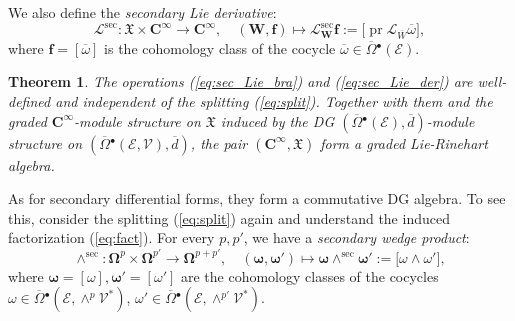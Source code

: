 \documentclass{conm-p-l}
\newtheorem{theorem}{Theorem}[section]
\theoremstyle{definition}
\theoremstyle{remark}
\numberwithin{equation}{section}
\begin{document}
We also define the \emph{secondary Lie derivative}:
\begin{equation}\label{eq:sec_Lie_der}
\mathcal L^{\mathrm{sec}} : \boldsymbol{\mathfrak X} \times \boldsymbol{C}^\infty \to  \boldsymbol{C}^\infty, \quad \left(\boldsymbol W, \boldsymbol f \right) \mapsto \mathcal L^{\mathrm{sec}}_{\boldsymbol W} \boldsymbol f :=\big[ \operatorname{pr} \mathcal L_{\overline W} \overline \omega \big],
\end{equation}
where $\boldsymbol f = [\overline \omega]$ is the cohomology class of the cocycle $\overline \omega \in \overline \Omega{}^\bullet (\mathscr E)$. 

\begin{theorem}\label{theor:LR}
The operations (\ref{eq:sec_Lie_bra}) and (\ref{eq:sec_Lie_der}) are well-defined and independent of the splitting (\ref{eq:split}). Together with them and the graded $\boldsymbol C^\infty$-module structure on $\boldsymbol{\mathfrak X}$ induced by the DG $(\overline \Omega{}^\bullet (\mathscr E), \overline d)$-module structure on $(\overline \Omega{}^\bullet (\mathscr E, \mathscr V), \overline d)$, the pair $(\boldsymbol{C}^\infty, \boldsymbol{\mathfrak X})$ form a graded Lie-Rinehart algebra.
\end{theorem}

As for secondary differential forms, they form a commutative DG algebra. To see this, consider the splitting (\ref{eq:split}) again and understand the induced factorization (\ref{eq:fact}). For every $p, p'$, we have a \emph{secondary wedge product}:
\begin{equation}\label{eq:wedge_sec}
\wedge^{\mathrm{sec}} : \boldsymbol \Omega^p \times \boldsymbol \Omega^{p'} \to \boldsymbol \Omega^{p+p'}, \quad (\boldsymbol \omega, \boldsymbol \omega') \mapsto \boldsymbol \omega \wedge^{\mathrm{sec}}  \boldsymbol \omega' := \big[ \omega \wedge \omega' \big],
\end{equation}
where $\boldsymbol \omega = [\omega], \boldsymbol \omega' = [\omega']$ are the cohomology classes of the cocycles $\omega \in \overline \Omega{}^\bullet (\mathscr E, \wedge^p \mathscr V^\ast)$, $\omega' \in \overline \Omega{}^\bullet (\mathscr E, \wedge^{p'} \mathscr V^\ast)$.
\end{document}
